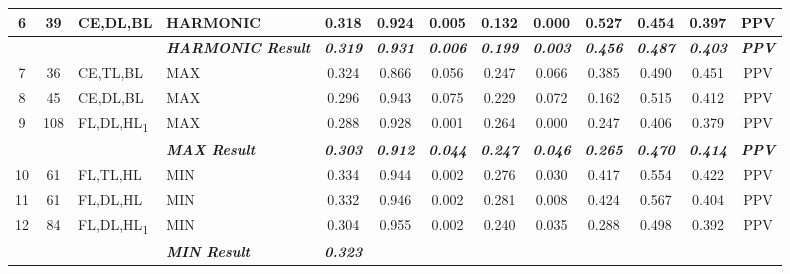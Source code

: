 \begin{table}[H]
{\begin{tabular}{ccl|l|c|c|c|c|c|c|c|c|c|}
  \multicolumn{1}{|c|}{6} &
    \multicolumn{1}{c|}{39} &
    CE,DL,BL &
    HARMONIC &
    0.318 &
    0.924 &
    0.005 &
    0.132 &
    0.000 &
    0.527 &
    0.454 &
    0.397 &
    PPV \\ \hline
  \textit{} &
    \textit{} &
    \textit{} &
    \textit{\textbf{HARMONIC Result}} &
    \textit{\textbf{0.319}} &
    \textit{\textbf{0.931}} &
    \textit{\textbf{0.006}} &
    \textit{\textbf{0.199}} &
    \textit{\textbf{0.003}} &
    \textit{\textbf{0.456}} &
    \textit{\textbf{0.487}} &
    \textit{\textbf{0.403}} &
    \textit{\textbf{PPV}} \\ \hline
  \multicolumn{1}{|c|}{7} &
    \multicolumn{1}{c|}{36} &
    CE,TL,BL &
    MAX &
    0.324 &
    0.866 &
    0.056 &
    0.247 &
    0.066 &
    0.385 &
    0.490 &
    0.451 &
    PPV \\ \hline
  \multicolumn{1}{|c|}{8} &
    \multicolumn{1}{c|}{45} &
    CE,DL,BL &
    MAX &
    0.296 &
    0.943 &
    0.075 &
    0.229 &
    0.072 &
    0.162 &
    0.515 &
    0.412 &
    PPV \\ \hline
  \multicolumn{1}{|c|}{9} &
    \multicolumn{1}{c|}{108} &
    FL,DL,HL\textsubscript{1} &
    MAX &
    0.288 &
    0.928 &
    0.001 &
    0.264 &
    0.000 &
    0.247 &
    0.406 &
    0.379 &
    PPV \\ \hline
  \textit{} &
    \textit{} &
    \textit{} &
    \textit{\textbf{MAX Result}} &
    \textit{\textbf{0.303}} &
    \textit{\textbf{0.912}} &
    \textit{\textbf{0.044}} &
    \textit{\textbf{0.247}} &
    \textit{\textbf{0.046}} &
    \textit{\textbf{0.265}} &
    \textit{\textbf{0.470}} &
    \textit{\textbf{0.414}} &
    \textit{\textbf{PPV}} \\ \hline
  \multicolumn{1}{|c|}{10} &
    \multicolumn{1}{c|}{61} &
    FL,TL,HL &
    MIN &
    0.334 &
    0.944 &
    0.002 &
    0.276 &
    0.030 &
    0.417 &
    0.554 &
    0.422 &
    PPV \\ \hline
  \multicolumn{1}{|c|}{11} &
    \multicolumn{1}{c|}{61} &
    FL,DL,HL &
    MIN &
    0.332 &
    0.946 &
    0.002 &
    0.281 &
    0.008 &
    0.424 &
    0.567 &
    0.404 &
    PPV \\ \hline
  \multicolumn{1}{|c|}{12} &
    \multicolumn{1}{c|}{84} &
    FL,DL,HL\textsubscript{1} &
    MIN &
    0.304 &
    0.955 &
    0.002 &
    0.240 &
    0.035 &
    0.288 &
    0.498 &
    0.392 &
    PPV \\ \hline
  \textit{} &
    \textit{} &
    \textit{} &
    \textit{\textbf{MIN Result}} &
    \textit{\textbf{0.323}} &

\end{tabular}}
\end{table}
